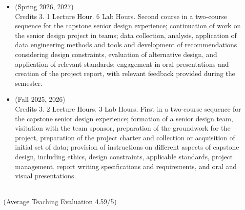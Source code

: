 \documentclass[11pt,oneside]{article}
\begin{document}
\begin{itemize}[leftmargin=40pt, label={-}]
\item {} (Spring 2026, 2027)\\
      Credits 3. 1 Lecture Hour. 6 Lab Hours. Second course in a two-course sequence for the capstone senior design experience; continuation of work on the senior design project in teams; data collection, analysis, application of data engineering methods and tools and development of recommendations considering design constraints, evaluation of alternative design, and application of relevant standards; engagement in oral presentations and creation of the project report, with relevant feedback provided during the semester.
\item {} (Fall 2025, 2026)\\
      Credits 3. 2 Lecture Hours. 3 Lab Hours. First in a two-course sequence for the capstone senior design experience; formation of a senior design team, visitation with the team sponsor, preparation of the groundwork for the project, preparation of the project charter and collection or acquisition of initial set of data; provision of instructions on different aspects of capstone design, including ethics, design constraints, applicable standards, project management, report writing specifications and requirements, and oral and visual presentations.
\end{itemize}
\vspace{8pt}
\hspace{40pt}{\frutigerregular Landscape Architecture and Urban Planning, Texas A\&M University}\\
\hspace{40pt}({Average Teaching Evaluation 4.59/5})
\end{document}
